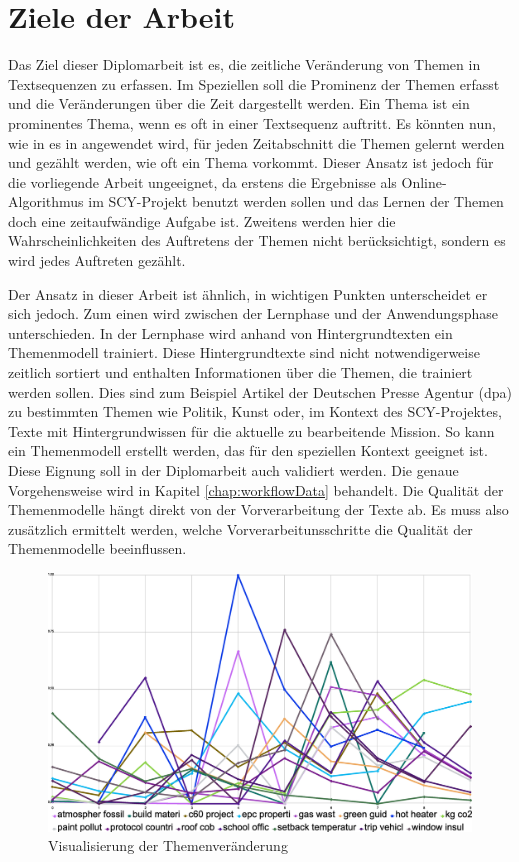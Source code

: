 \section{Ziele der Arbeit}
\label{chap:goals}


Das Ziel dieser Diplomarbeit ist es, die zeitliche Veränderung von Themen in Textsequenzen zu erfassen. Im Speziellen soll die Prominenz der Themen erfasst und die Veränderungen über die Zeit dargestellt werden. Ein Thema ist ein prominentes Thema, wenn es oft in einer Textsequenz auftritt. Es könnten nun, wie in es in \citet{ldaSourceCode} angewendet wird, für jeden Zeitabschnitt die Themen gelernt werden und gezählt werden, wie oft ein Thema vorkommt. Dieser Ansatz ist jedoch für die vorliegende Arbeit ungeeignet, da erstens die Ergebnisse als Online-Algorithmus im SCY-Projekt benutzt werden sollen und das Lernen der Themen doch eine zeitaufwändige Aufgabe ist. Zweitens werden hier die Wahrscheinlichkeiten des Auftretens der Themen nicht berücksichtigt, sondern es wird jedes Auftreten gezählt.

Der Ansatz in dieser Arbeit ist ähnlich, in wichtigen Punkten unterscheidet er sich jedoch. Zum einen wird zwischen der Lernphase und der Anwendungsphase unterschieden. In der Lernphase wird anhand von Hintergrundtexten ein Themenmodell trainiert. Diese Hintergrundtexte sind nicht notwendigerweise zeitlich sortiert und enthalten Informationen über die Themen, die trainiert werden sollen. Dies sind zum Beispiel Artikel der Deutschen Presse Agentur (dpa) zu bestimmten Themen wie Politik, Kunst oder, im Kontext des SCY-Projektes, Texte mit Hintergrundwissen für die aktuelle zu bearbeitende Mission. So kann ein Themenmodell erstellt werden, das für den speziellen Kontext geeignet ist. Diese Eignung soll in der Diplomarbeit auch validiert werden. Die genaue Vorgehensweise wird in Kapitel \ref{chap:workflowData} behandelt. Die Qualität der Themenmodelle hängt direkt von der Vorverarbeitung der Texte ab. Es muss also zusätzlich ermittelt werden, welche Vorverarbeitunsschritte die Qualität der Themenmodelle beeinflussen.

\begin{figure}[ht]
\includegraphics[width=1.0\textwidth]{images/content/01_introduction/chart_betweeness} 
\caption{Visualisierung der Themenveränderung}
\label{fig:topicChange}
\end{figure}

